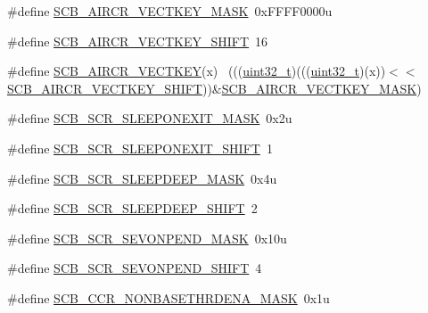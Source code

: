 \begin{DoxyCompactItemize}
\item 
\#define \hyperlink{group___s_c_b___register___masks_ga0929f6fe9ab80dd345abdc59f44fc492}{S\+C\+B\+\_\+\+A\+I\+R\+C\+R\+\_\+\+V\+E\+C\+T\+K\+E\+Y\+\_\+\+M\+A\+SK}~0x\+F\+F\+F\+F0000u
\item 
\#define \hyperlink{group___s_c_b___register___masks_ga81e3a91d7ab352abfc1227b928677c37}{S\+C\+B\+\_\+\+A\+I\+R\+C\+R\+\_\+\+V\+E\+C\+T\+K\+E\+Y\+\_\+\+S\+H\+I\+FT}~16
\item 
\#define \hyperlink{group___s_c_b___register___masks_ga40e0d3e5c8c9f49623df8ef272c987dd}{S\+C\+B\+\_\+\+A\+I\+R\+C\+R\+\_\+\+V\+E\+C\+T\+K\+EY}(x)                                      ~(((\hyperlink{_p_e___types_8h_a33594304e786b158f3fb30289278f5af}{uint32\+\_\+t})(((\hyperlink{_p_e___types_8h_a33594304e786b158f3fb30289278f5af}{uint32\+\_\+t})(x))$<$$<$\hyperlink{group___s_c_b___register___masks_ga81e3a91d7ab352abfc1227b928677c37}{S\+C\+B\+\_\+\+A\+I\+R\+C\+R\+\_\+\+V\+E\+C\+T\+K\+E\+Y\+\_\+\+S\+H\+I\+FT}))\&\hyperlink{group___s_c_b___register___masks_ga0929f6fe9ab80dd345abdc59f44fc492}{S\+C\+B\+\_\+\+A\+I\+R\+C\+R\+\_\+\+V\+E\+C\+T\+K\+E\+Y\+\_\+\+M\+A\+SK})
\item 
\#define \hyperlink{group___s_c_b___register___masks_ga14474f291208128b6d817bd48c684fc9}{S\+C\+B\+\_\+\+S\+C\+R\+\_\+\+S\+L\+E\+E\+P\+O\+N\+E\+X\+I\+T\+\_\+\+M\+A\+SK}~0x2u
\item 
\#define \hyperlink{group___s_c_b___register___masks_gafc63d56cb8407238a9abe5ad54a00809}{S\+C\+B\+\_\+\+S\+C\+R\+\_\+\+S\+L\+E\+E\+P\+O\+N\+E\+X\+I\+T\+\_\+\+S\+H\+I\+FT}~1
\item 
\#define \hyperlink{group___s_c_b___register___masks_ga60307c79f9fb0f1b5b4afe848166f3cf}{S\+C\+B\+\_\+\+S\+C\+R\+\_\+\+S\+L\+E\+E\+P\+D\+E\+E\+P\+\_\+\+M\+A\+SK}~0x4u
\item 
\#define \hyperlink{group___s_c_b___register___masks_ga43cddab3431812a4cdf202bf359506da}{S\+C\+B\+\_\+\+S\+C\+R\+\_\+\+S\+L\+E\+E\+P\+D\+E\+E\+P\+\_\+\+S\+H\+I\+FT}~2
\item 
\#define \hyperlink{group___s_c_b___register___masks_ga6603e0e99280ae6a73d7ddf1d38075f5}{S\+C\+B\+\_\+\+S\+C\+R\+\_\+\+S\+E\+V\+O\+N\+P\+E\+N\+D\+\_\+\+M\+A\+SK}~0x10u
\item 
\#define \hyperlink{group___s_c_b___register___masks_ga61abde1285bfce2342c1e93a1ecd3166}{S\+C\+B\+\_\+\+S\+C\+R\+\_\+\+S\+E\+V\+O\+N\+P\+E\+N\+D\+\_\+\+S\+H\+I\+FT}~4
\item 
\#define \hyperlink{group___s_c_b___register___masks_ga363d47714bf931e91353320a934f0a4f}{S\+C\+B\+\_\+\+C\+C\+R\+\_\+\+N\+O\+N\+B\+A\+S\+E\+T\+H\+R\+D\+E\+N\+A\+\_\+\+M\+A\+SK}~0x1u
$$
\end{DoxyCompactItemize}
